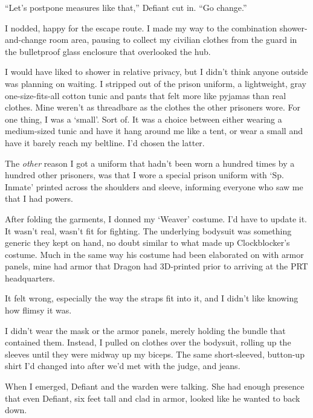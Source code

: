 ``Let's postpone measures like that,'' Defiant cut in.  ``Go change.''



I nodded, happy for the escape route.  I made my way to the combination shower-and-change room area, pausing to collect my civilian clothes from the guard in the bulletproof glass enclosure that overlooked the hub.



I would have liked to shower in relative privacy, but I didn't think anyone outside was planning on waiting.  I stripped out of the prison uniform, a lightweight, gray one-size-fits-all cotton tunic and pants that felt more like pyjamas than real clothes.  Mine weren't as threadbare as the clothes the other prisoners wore.  For one thing, I was a `small'.  Sort of.  It was a choice between either wearing a medium-sized tunic and have it hang around me like a tent, or wear a small and have it barely reach my beltline.  I'd chosen the latter.



The \emph{other} reason I got a uniform that hadn't been worn a hundred times by a hundred other prisoners, was that I wore a special prison uniform with `Sp. Inmate' printed across the shoulders and sleeve, informing everyone who saw me that I had powers.



After folding the garments, I donned my `Weaver' costume.  I'd have to update it.  It wasn't real, wasn't fit for fighting.  The underlying bodysuit was something generic they kept on hand, no doubt similar to what made up Clockblocker's costume.  Much in the same way his costume had been elaborated on with armor panels, mine had armor that Dragon had 3D-printed prior to arriving at the PRT headquarters.



It felt wrong, especially the way the straps fit into it, and I didn't like knowing how flimsy it was.



I didn't wear the mask or the armor panels, merely holding the bundle that contained them.  Instead, I pulled on clothes over the bodysuit, rolling up the sleeves until they were midway up my biceps.  The same short-sleeved, button-up shirt I'd changed into after we'd met with the judge, and jeans.



When I emerged, Defiant and the warden were talking.  She had enough presence that even Defiant, six feet tall and clad in armor, looked like he wanted to back down.



